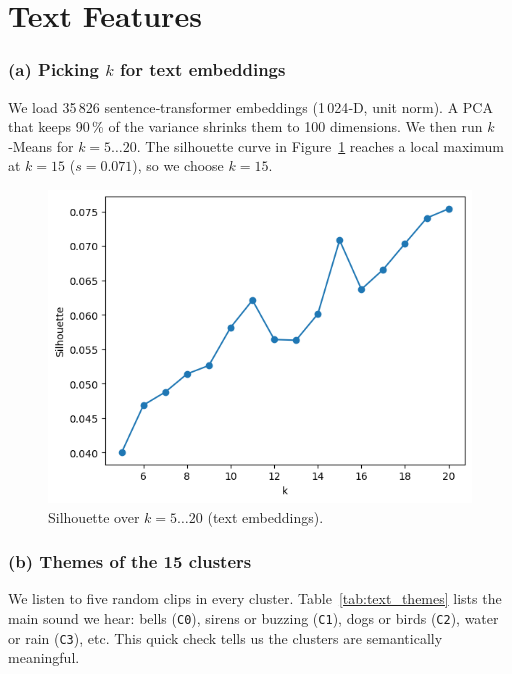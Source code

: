 \documentclass{article}
\begin{document}
\maketitle



\section{Text Features}

\subsubsection{(a) Picking $k$ for text embeddings}
We load 35\,826 sentence‑transformer embeddings (1\,024‑D, unit norm). A PCA that keeps 90\,\% of the variance shrinks them to 100 dimensions. We then run $k$‑Means for $k=5\ldots20$. The silhouette curve in Figure~\ref{fig:text_silhouette} reaches a local maximum at $k=15$ ($s=0.071$), so we choose \textbf{$k=15$}.

\begin{figure}[h]
  \centering
  \includegraphics[width=.40\linewidth]{figs_tang/04_silhouette_k.png}
  \caption{Silhouette over $k=5\ldots20$ (text embeddings).}
  \label{fig:text_silhouette}
\end{figure}

\subsubsection{(b) Themes of the 15 clusters}
We listen to five random clips in every cluster. Table~\ref{tab:text_themes} lists the main sound we hear: bells (\texttt{C0}), sirens or buzzing (\texttt{C1}), dogs or birds (\texttt{C2}), water or rain (\texttt{C3}), etc. This quick check tells us the clusters are semantically meaningful.
\end{document}
